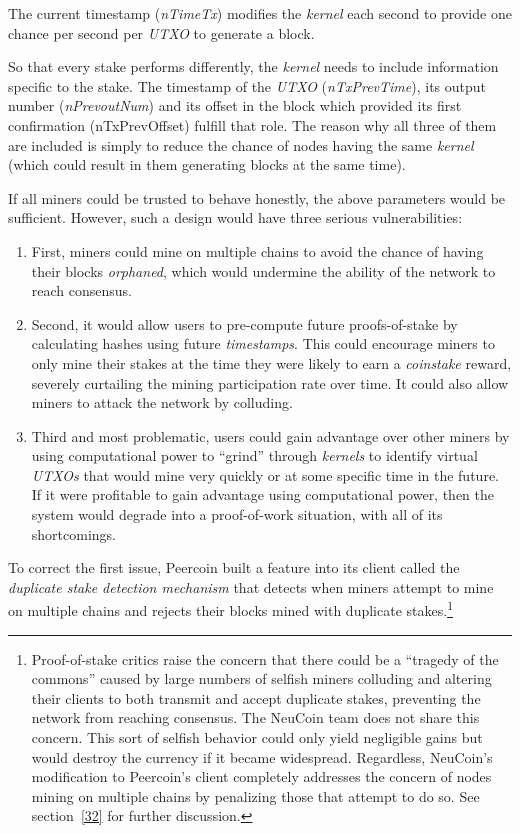 \documentclass[a4paper,11pt]{article}
\begin{document}
The current timestamp (\textit{nTimeTx}) modifies the \textit{kernel} each second to provide one chance per second per \textit{UTXO} to generate a block. 

So that every stake performs differently, the \textit{kernel} needs to include information specific to the stake. The timestamp of the \textit{UTXO} (\textit{nTxPrevTime}), its output number (\textit{nPrevoutNum}) and its offset in the block which provided its first confirmation (nTxPrevOffset) fulfill that role. The reason why all three of them are included is simply to reduce the chance of nodes having the same \textit{kernel} (which could result in them generating blocks at the same time).

If all miners could be trusted to behave honestly, the above parameters would be sufficient. However, such a design would have three serious vulnerabilities:
\begin{enumerate}
\item{First, miners could mine on multiple chains to avoid the chance of having their blocks \textit{orphaned}, which would undermine the ability of the network to reach consensus.}
\item{Second, it would allow users to pre-compute future proofs-of-stake by calculating hashes using future \textit{timestamps}. This could encourage miners to only mine their stakes at the time they were likely to earn a \textit{\textit{coinstake}} reward, severely curtailing the mining participation rate over time. It could also allow miners to attack the network by colluding.}
\item{Third and most problematic, users could gain advantage over other miners by using computational power to ``grind'' through \textit{\textit{kernels}} to identify virtual \textit{UTXOs} that would mine very quickly or at some specific time in the future. If it were profitable to gain advantage using computational power, then the system would degrade into a proof-of-work situation, with all of its shortcomings.}
\end{enumerate}

To correct the first issue, Peercoin built a feature into its client called the \textit{duplicate stake detection mechanism} that detects when miners attempt to mine on multiple chains and rejects their blocks mined with duplicate stakes.\footnote{Proof-of-stake critics raise the concern that there could be a “tragedy of the commons” caused by large numbers of selfish miners colluding and altering their clients to both transmit and accept duplicate stakes, preventing the network from reaching consensus. The NeuCoin team does not share this concern. This sort of selfish behavior could only yield negligible gains but would destroy the currency if it became widespread. Regardless, NeuCoin's modification to Peercoin's client completely addresses the concern of nodes mining on multiple chains by penalizing those that attempt to do so. See section~\ref{32} for further discussion.}
\end{document}

